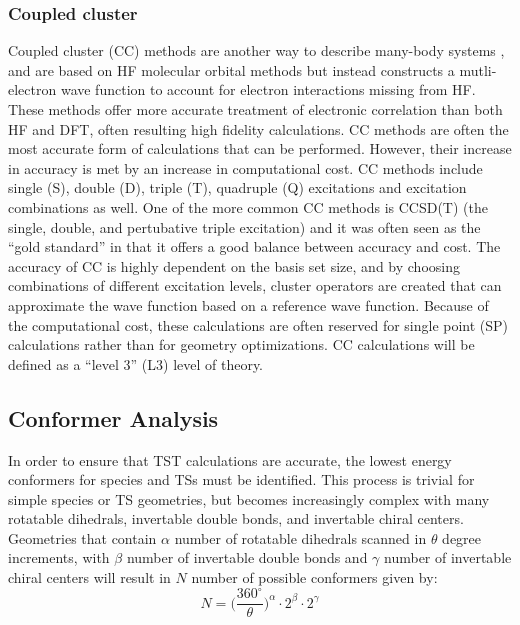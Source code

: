 \documentclass[preprint, 11pt]{elsarticle} %
\begin{document}
\subsubsection{Coupled cluster}

Coupled cluster (CC) methods are another way to describe many-body systems \cite{CC:2002}, and are based on HF molecular orbital methods but instead constructs a mutli-electron wave function to account for electron interactions missing from HF.
These methods offer more accurate treatment of electronic correlation than both HF and DFT, often resulting high fidelity calculations. 
CC methods are often the most accurate form of calculations that can be performed. However, their increase in accuracy is met by an increase in computational cost.
CC methods include single (S), double (D), triple (T), quadruple (Q) excitations and excitation combinations as well.
One of the more common CC methods is CCSD(T) (the single, double, and pertubative triple excitation) and it was often seen as the ``gold standard'' in that it offers a good balance between accuracy and cost.
The accuracy of CC is highly dependent on the basis set size, and by choosing combinations of different excitation levels, cluster operators are created that can approximate the wave function based on a reference wave function.
Because of the computational cost, these calculations are often reserved for single point (SP) calculations rather than for geometry optimizations.
CC calculations will be defined as a ``level 3'' (L3) level of theory.



\subsection{Conformer Analysis}

In order to ensure that TST calculations are accurate, the lowest energy conformers for species and TSs must be identified.
This process is trivial for simple species or TS geometries, but becomes increasingly complex with many rotatable dihedrals, invertable double bonds, and invertable chiral centers. 
Geometries that contain $\alpha$ number of rotatable dihedrals scanned in $\theta$ degree increments, with $\beta$ number of invertable double bonds and $\gamma$ number of invertable chiral centers will result in $N$ number of possible conformers given by: 
\begin{equation}
    N = \Big(\frac{360^\circ}{\theta}\Big)^{\alpha} \cdot 2^{\beta} \cdot 2^{\gamma}
    \label{eq:confs}
\end{equation}
\end{document}
